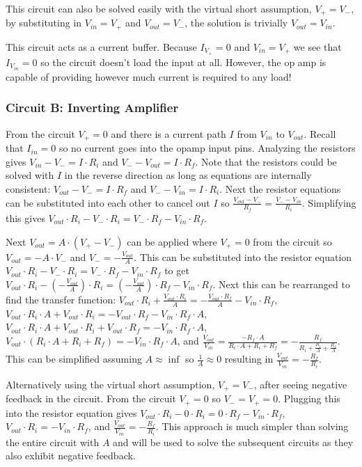 \documentclass[main.tex]{subfiles}
\begin{document}
This circuit can also be solved easily with the virtual short assumption, $V_{+} = V_{-}$, by substituting in $V_{in} = V_{+}$ and $V_{out} = V_{-}$, the solution is trivially $V_{out} = V_{in}$.

This circuit acts as a current buffer. Because $I_{V_{+}} = 0$ and $V_{in} = V_{+}$ we see that $I_{V_{in}} = 0$ so the circuit doesn't load the input at all. However, the op amp is capable of providing however much current is required to any load! 

\subsubsection{Circuit B: Inverting Amplifier}
From the circuit $V_{+} = 0$ and there is a current path $I$ from $V_{in}$ to $V_{out}$. Recall that $I_{in} = 0$ so no current goes into the opamp input pins. Analyzing the resistors gives $V_{in} - V_{-} = I \cdot R_i$ and $V_{-} - V_{out} = I \cdot R_f$. Note that the resistors could be solved with $I$ in the reverse direction as long as equations are internally consistent: $V_{out} - V_{-} = I \cdot R_f$ and $V_{-} - V_{in} = I \cdot R_i$. Next the resistor equations can be substituted into each other to cancel out $I$ so $\frac{V_{out} - V_{-}}{R_f} = \frac{V_{-} - V_{in}}{R_i}$. Simplifying this gives $V_{out} \cdot R_i - V_{-} \cdot R_i = V_{-} \cdot R_f - V_{in} \cdot R_f$. 

Next $V_{out} = A \cdot (V_{+} - V_{-})$ can be applied where $V_{+} = 0$ from the circuit so $V_{out} = -A \cdot V_{-}$ and $V_{-} = -\frac{V_{out}}{A}$. This can be substituted into the resistor equation $V_{out} \cdot R_i - V_{-} \cdot R_i = V_{-} \cdot R_f - V_{in} \cdot R_f$ to get $V_{out} \cdot R_i - (-\frac{V_{out}}{A}) \cdot R_i = (-\frac{V_{out}}{A}) \cdot R_f - V_{in} \cdot R_f$. Next this can be rearranged to find the transfer function: $V_{out} \cdot R_i + \frac{V_{out} \cdot R_i}{A} = -\frac{V_{out} \cdot R_f}{A} - V_{in} \cdot R_f$, $V_{out} \cdot R_i \cdot A + V_{out} \cdot R_i = -V_{out} \cdot R_f - V_{in} \cdot R_f \cdot A$, $V_{out} \cdot R_i \cdot A + V_{out} \cdot R_i + V_{out} \cdot R_f = - V_{in} \cdot R_f \cdot A$, $V_{out} \cdot (R_i \cdot A + R_i + R_f) = - V_{in} \cdot R_f \cdot A$, and $\frac{V_{out}}{V_{in}} = \frac{-R_f \cdot A}{R_i \cdot A + R_i + R_f} = -\frac{R_f}{R_i + \frac{R_i}{A} + \frac{R_f}{A}}$. This can be simplified assuming $A \approx \inf$ so $\frac{1}{A} \approx 0$ resulting in $\frac{V_{out}}{V_{in}} = -\frac{R_f}{R_i}$. 

Alternatively using the virtual short assumption, $V_{+} = V_{-}$, after seeing negative feedback in the circuit. From the circuit $V_{+} = 0$ so $V_{-} = V_{+} = 0$. Plugging this into the resistor equation gives $V_{out} \cdot R_i - 0 \cdot R_i = 0 \cdot R_f - V_{in} \cdot R_f$, $V_{out} \cdot R_i = - V_{in} \cdot R_f$, and $\frac{V_{out}}{V_{in}} = -\frac{R_f}{R_i}$. This approach is much simpler than solving the entire circuit with $A$ and will be used to solve the subsequent circuits as they also exhibit negative feedback.  
\end{document}
